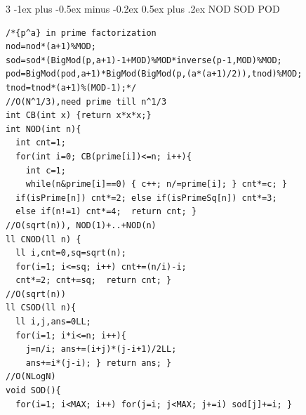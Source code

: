 \documentclass[8pt,a4paper,onesided]{article}
\makeatletter
\renewcommand{\subsection}{\@startsection{subsection}{2}{0mm}
    {-1ex plus -0.5ex minus -0.2ex} %
    {0.5ex plus .2ex}                %
    {\normalfont\large\bfseries}}    %
\makeatother
\begin{document}
\begin{multicols}{3}
\subsection{NOD SOD POD}
\begin{verbatim}
/*{p^a} in prime factorization
nod=nod*(a+1)%MOD; 
sod=sod*(BigMod(p,a+1)-1+MOD)%MOD*inverse(p-1,MOD)%MOD;
pod=BigMod(pod,a+1)*BigMod(BigMod(p,(a*(a+1)/2)),tnod)%MOD;
tnod=tnod*(a+1)%(MOD-1);*/
//O(N^1/3),need prime till n^1/3
int CB(int x) {return x*x*x;}
int NOD(int n){
  int cnt=1;
  for(int i=0; CB(prime[i])<=n; i++){
    int c=1;
    while(n&prime[i]==0) { c++; n/=prime[i]; } cnt*=c; }
  if(isPrime[n]) cnt*=2; else if(isPrimeSq[n]) cnt*=3;
  else if(n!=1) cnt*=4;  return cnt; }
//O(sqrt(n)), NOD(1)+..+NOD(n)
ll CNOD(ll n) {
  ll i,cnt=0,sq=sqrt(n);
  for(i=1; i<=sq; i++) cnt+=(n/i)-i;
  cnt*=2; cnt+=sq;  return cnt; }
//O(sqrt(n))
ll CSOD(ll n){
  ll i,j,ans=0LL;
  for(i=1; i*i<=n; i++){
    j=n/i; ans+=(i+j)*(j-i+1)/2LL;
    ans+=i*(j-i); } return ans; }
//O(NLogN)
void SOD(){
  for(i=1; i<MAX; i++) for(j=i; j<MAX; j+=i) sod[j]+=i; }
\end{verbatim}

\end{multicols}
\end{document}
